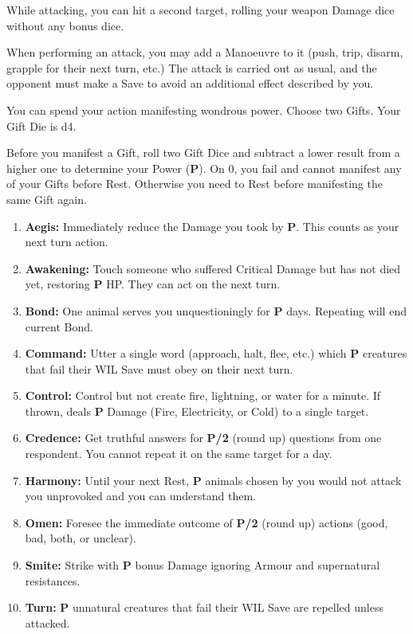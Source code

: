 \documentclass[itdr]{subfiles}
\begin{document}
\break

\feathp
While attacking, you can hit a second target, rolling your weapon Damage dice without any bonus dice.

\vfill
{}
\feathp
When performing an attack, you may add a Manoeuvre to it (push, trip, disarm, grapple for their next turn, etc.) The attack is carried out as usual, and the opponent must make a Save to avoid an additional effect described by you.

\vfill
{}
\featmt
You can spend your action manifesting wondrous power. Choose two Gifts. Your Gift Die is d4.

Before you manifest a Gift, roll two Gift Dice and subtract a lower result from a higher one to determine your Power (\textbf{P}). On 0, you fail and cannot manifest any of your Gifts before Rest. Otherwise you need to Rest before manifesting the same Gift again.

\begin{enumerate}
	\item \textbf{Aegis:} Immediately reduce the Damage you took by \textbf{P}. This counts as your next turn action.
	\item \textbf{Awakening:} Touch someone who suffered \mbox{Critical} Damage but has not died yet, restoring \textbf{P} HP. They can act on the next turn.
	\item \textbf{Bond:} One animal serves you unquestioningly for \textbf{P} days. Repeating will end current Bond.
	\item \textbf{Command:} Utter a single word (approach, halt, flee, etc.) which \textbf{P} creatures that fail their WIL Save must obey on their next turn.
	\item \textbf{Control:} Control but not create fire, lightning, or water for a minute. If thrown, deals \textbf{P} Damage (Fire, Electricity, or Cold) to a single target.
	\item \textbf{Credence:} Get truthful answers for \textbf{P/2} (round up) questions from one respondent. You cannot repeat it on the same target for a day.
	\item \textbf{Harmony:} Until your next Rest, \textbf{P} animals chosen by you would not attack you unprovoked and you can understand them.
	\item \textbf{Omen:} Foresee the immediate outcome of \textbf{P/2} (round up) actions (good, bad, both, or unclear).
	\item \textbf{Smite:} Strike with \textbf{P} bonus Damage ignoring Armour and supernatural resistances.
	\item \textbf{Turn:} \textbf{P} unnatural creatures that fail their WIL Save are repelled unless attacked.
\end{enumerate}
\end{document}
